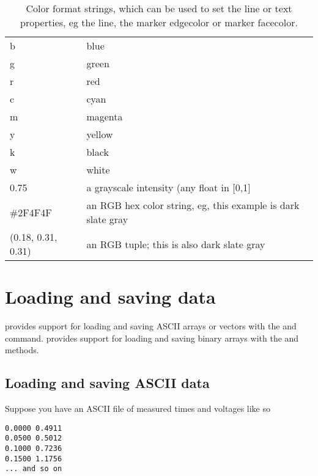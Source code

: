 \documentclass[twoside]{book}
\begin{document}


\begin{table}[htbp]
  \centering
  \begin{tabular}[t]{|l|l|}\hline
      b  & blue\\
      g  & green\\
      r  & red\\
      c  & cyan\\
      m  & magenta\\
      y  & yellow\\
      k  & black\\
      w  & white\\
      0.75  & a grayscale intensity (any float in [0,1]\\
      \#2F4F4F & an RGB hex color string, eg, this example is dark slate
      gray\\
      (0.18, 0.31, 0.31)  & an RGB tuple; this is also dark slate gray\\\hline
  \end{tabular}
  \caption{\label{tab:color_strings}Color format strings, which can be
      used to set the line or text properties, eg the line, the marker
      edgecolor or marker facecolor.  }
\end{table}

\section{Loading and saving data}
\label{sec:loading_data}

 provides support for loading and saving
ASCII arrays or vectors with the  and  command.
 provides support for loading and saving
binary arrays with the  and  methods.

\subsection{Loading and saving ASCII data}
\label{sec:ascii_data}
Suppose you have an ASCII file of measured times and voltages like so

\begin{verbatim}
0.0000 0.4911
0.0500 0.5012
0.1000 0.7236
0.1500 1.1756
... and so on
\end{verbatim}
\end{document}
